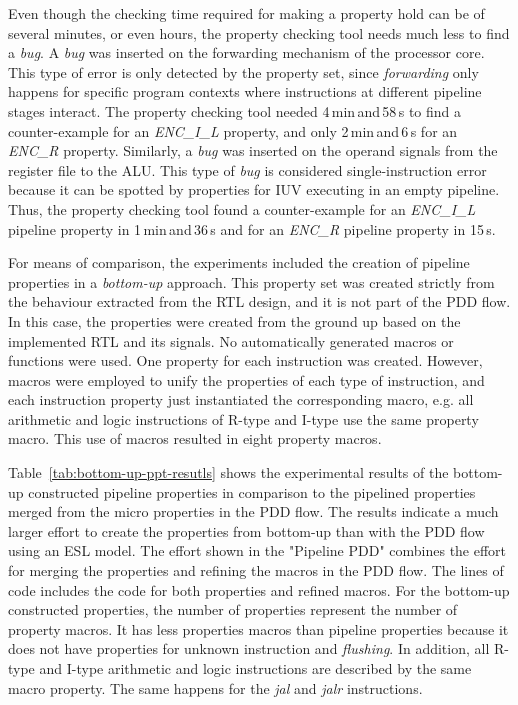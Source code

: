 Even though the checking time required for making a property hold can be of several minutes, or even hours, the property checking tool needs much less to find a \textit{bug}. A \textit{bug} was inserted on the forwarding mechanism of the processor core. This type of error is only detected by the \SSQED{} property set, since \textit{forwarding} only happens for specific program contexts where instructions at different pipeline stages interact. The property checking tool needed 4\,min\,and\,58\,s to find a counter-example for an \textit{ENC\_I\_L} \SSQED{} property, and only 2\,min\,and\,6\,s for an \textit{ENC\_R} \SSQED{} property. Similarly, a \textit{bug} was inserted on the operand signals from the register file to the ALU. This type of \textit{bug} is considered single-instruction error because it can be spotted by properties for IUV executing in an empty pipeline. Thus, the property checking tool found a counter-example for an \textit{ENC\_I\_L} pipeline property in 1\,min\,and\,36\,s and for an \textit{ENC\_R} pipeline property in 15\,s.

For means of comparison, the experiments included the creation of pipeline properties in a \textit{bottom-up} approach. This property set was created strictly from the behaviour extracted from the RTL design, and it is not part of the PDD flow. In this case, the properties were created from the ground up based on the implemented RTL and its signals. No automatically generated macros or functions were used. One property for each instruction was created. However, macros were employed to unify the properties of each type of instruction, and each instruction property just instantiated the corresponding macro, e.g. all arithmetic and logic instructions of R-type and I-type use the same property macro. This use of macros resulted in eight property macros.

Table~\ref{tab:bottom-up-ppt-resutls} shows the experimental results of the bottom-up constructed pipeline properties in comparison to the pipelined properties merged from the micro properties in the PDD flow. The results indicate a much larger effort to create the properties from bottom-up than with the PDD flow using an ESL model. The effort shown in the "Pipeline PDD" combines the effort for merging the properties and refining the macros in the PDD flow. The lines of code includes the code for both properties and refined macros. For the bottom-up constructed properties, the number of properties represent the number of property macros. It has less properties macros than pipeline properties because it does not have properties for unknown instruction and \textit{flushing}. In addition, all R-type and I-type arithmetic and logic instructions are described by the same macro property. The same happens for the \textit{jal} and \textit{jalr} instructions. 

